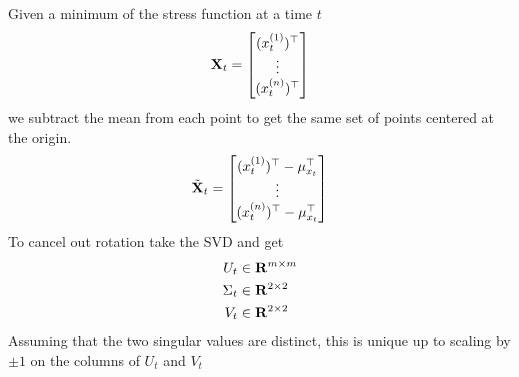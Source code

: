 Given a minimum of the stress function at a time $t$
\begin{align}
    \mathbf{X}_t = \begin{bmatrix}
        (\x[1])^\top \\ \vdots \\ (\x[n])^\top
    \end{bmatrix}
\end{align}
we subtract the mean from each point to get the same set of points centered at the origin.
\begin{align}
    \tilde{\mathbf{X}}_t = \begin{bmatrix}
        (\x[1])^\top - \mu_{x_t}^\top \\ \vdots \\ (\x[n])^\top - \mu_{x_t}^\top
    \end{bmatrix}
\end{align}
To cancel out rotation take the SVD and get 
\begin{align*}
    U_t &\in \R{m \times m} \\
    \Sigma_t &\in \R{2 \times 2} \\
    V_t &\in \R{2 \times 2}
\end{align*}
Assuming that the two singular values are distinct, this is unique up to scaling by $\pm 1$ on the columns of $U_t$ and $V_t$